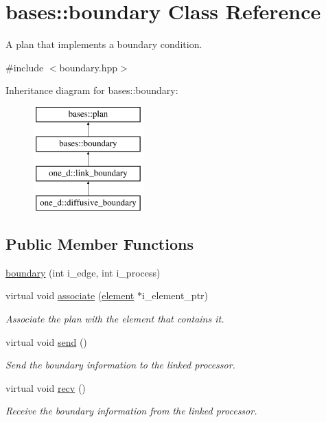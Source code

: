 \hypertarget{classbases_1_1boundary}{\section{bases\-:\-:boundary Class Reference}
\label{classbases_1_1boundary}
}


A plan that implements a boundary condition.  




{\ttfamily \#include $<$boundary.\-hpp$>$}

Inheritance diagram for bases\-:\-:boundary\-:\begin{figure}[H]
\begin{center}
\leavevmode
\includegraphics[height=4.000000cm]{classbases_1_1boundary}
\end{center}
\end{figure}
\subsection*{Public Member Functions}
\begin{DoxyCompactItemize}
\item 
\hyperlink{classbases_1_1boundary_a3633e4c08767f16e437e72701b03014c}{boundary} (int i\-\_\-edge, int i\-\_\-process)
\item 
virtual void \hyperlink{classbases_1_1boundary_a54ba54d2bb10f841d69c219af3b0fdc0}{associate} (\hyperlink{classbases_1_1element}{element} $\ast$i\-\_\-element\-\_\-ptr)
\begin{DoxyCompactList}\small\item\em Associate the plan with the element that contains it. \end{DoxyCompactList}\item 
virtual void \hyperlink{classbases_1_1boundary_a84c47f979eac14d45c8ff9c09cc170a8}{send} ()
\begin{DoxyCompactList}\small\item\em Send the boundary information to the linked processor. \end{DoxyCompactList}\item 
virtual void \hyperlink{classbases_1_1boundary_aa0983fe4b4ef2005720aec25a06eaff2}{recv} ()
\begin{DoxyCompactList}\small\item\em Receive the boundary information from the linked processor. \end{DoxyCompactList}\end{DoxyCompactItemize}
